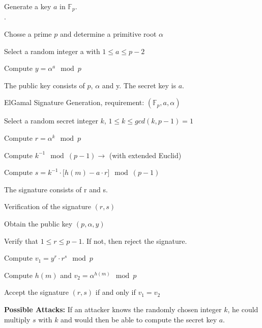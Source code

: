 Generate a key $a$ in $\mathbb{F}_p$.\\.
\begin{aufzaehlung}
\item Chosse a prime $p$ and determine a primitive root $\alpha$
\item Select a random integer a with $1 \leq a \leq p-2$
\item Compute $y=\alpha^a \mod p$
\item The public key consists of $p$, $\alpha$ and y. The secret key is $a$.
\end{aufzaehlung}

ElGamal Signature Generation, requirement: $(\mathbb{F}_p, a, \alpha)$
\begin{aufzaehlung}
  	\item  Select a random secret integer $k$, $1 \leq k \leq gcd(k,p-1)=1$ 
  	\item  Compute $r=\alpha^k \mod p$ 
  	\item  Compute $k^{-1} \mod (p-1) \to$ (with extended Euclid)
  	\item  Compute $s=k^{-1} \cdot \lbrack h(m) - a \cdot r \rbrack \mod (p-1)$
  	\item  The signature consists of r and s.
\end{aufzaehlung}

Verification of the signature $(r,s)$
\begin{aufzaehlung}
  \item   Obtain the public key $(p,\alpha,y)$
  \item   Verify that $1 \leq r \leq p-1$. If not, then reject the signature.
  \item   Compute $v_1=y^r \cdot r^s \mod p$
  \item   Compute $h(m)$ and $v_2=\alpha^{h(m)} \mod p$
  \item   Accept the signature $(r,s)$ if and only if $v_1=v_2$
\end{aufzaehlung}

\textbf{Possible Attacks:} If an attacker knows the randomly chosen integer $k$, he could multiply $s$ with $k$ and would then be able to compute the secret key $a$.


